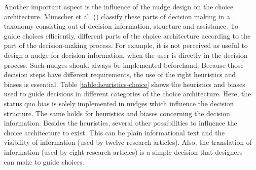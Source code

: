 Another important aspect is the influence of the nudge design on the choice architecture. Münscher et al. (\citeyear{munscher_review_2016}) classify these parts of decision making in a taxonomy consisting out of decision information, structure and assistance. To guide choices efficiently, different parts of the choice architecture according to the part of the decision-making process. For example, it is not perceived as useful to design a nudge for decision information, when the user is directly in the decision process. Such nudges should always be implemented beforehand. Because those decision steps have different requirements, the use of the right heuristics and biases is essential. Table \ref{table:heuristics-choice} shows the heuristics and biases used to guide decisions in different categories of the choice architecture. Here, the status quo bias is solely implemented in nudges which influence the decision structure. The same holds for heuristics and biases concerning the decision information. Besides the heuristics, several other possibilities to influence the choice architecture to exist. This can be plain informational text and the visibility of information (used by twelve research articles). Also, the translation of information (used by eight research articles) is a simple decision that designers can make to guide choices. 

